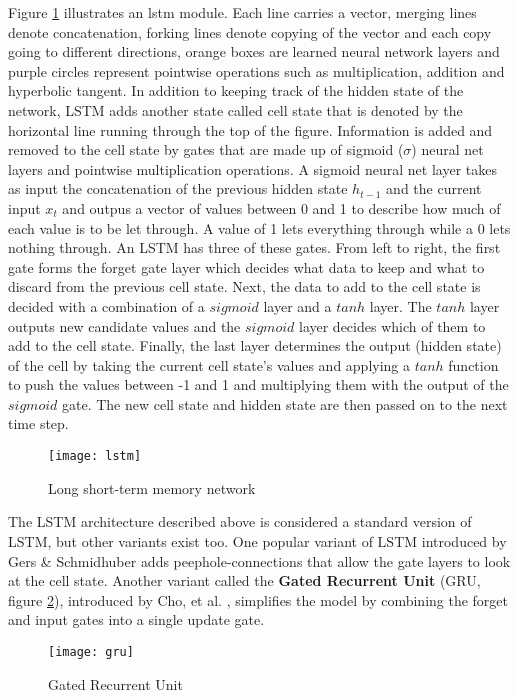 Figure \ref{fig:lstm} illustrates an lstm module. Each line carries a vector, merging lines denote concatenation, forking lines denote copying of the vector and each copy going to different directions, orange boxes are learned neural network layers and purple circles represent pointwise operations such as multiplication, addition and hyperbolic tangent.
In addition to keeping track of the hidden state of the network, LSTM adds another state called cell state that is denoted by the horizontal line running through the top of the figure.
Information is added and removed to the cell state by gates that are made up of sigmoid ($\sigma$) neural net layers and pointwise multiplication operations.
A sigmoid neural net layer takes as input the concatenation of the previous hidden state $h_{t-1}$ and the current input $x_t$ and outpus a vector of values between 0 and 1 to describe how much of each value is to be let through.
A value of 1 lets everything through while a 0 lets nothing through.
An LSTM has three of these gates.
From left to right, the first gate forms the forget gate layer which decides what data to keep and what to discard from the previous cell state.
Next, the data to add to the cell state is decided with a combination of a $sigmoid$ layer and a $tanh$ layer. The $tanh$ layer outputs new candidate values and the $sigmoid$ layer decides which of them to add to the cell state.
Finally, the last layer determines the output (hidden state) of the cell by taking the current cell state's values and applying a $tanh$ function to push the values between -1 and 1 and multiplying them with the output of the $sigmoid$ gate.
The new cell state and hidden state are then passed on to the next time step.
\begin{figure}[t]
\texttt{[image: lstm]}
\centering
\caption{Long short-term memory network}
\label{fig:lstm}
\end{figure}

The LSTM architecture described above is considered a standard version of LSTM, but other variants exist too.
One popular variant of LSTM introduced by Gers \& Schmidhuber \cite{gers2000a} adds peephole-connections that allow the gate layers to look at the cell state.
Another variant called the \textbf{Gated Recurrent Unit} (GRU, figure \ref{fig:gru}), introduced by Cho, et al. \cite{cho2014}, simplifies the model by combining the forget and input gates into a single update gate.
\begin{figure}[t]
\texttt{[image: gru]}
\centering
\caption{Gated Recurrent Unit}
\label{fig:gru}
\end{figure}

